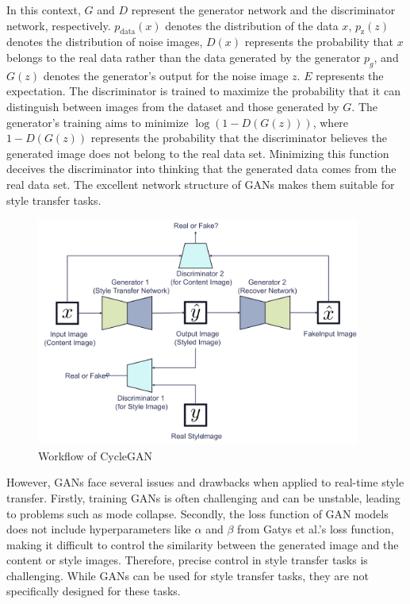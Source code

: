 In this context, $G$ and $D$ represent the generator network and the discriminator network, respectively. $p_{\text{data}}(x)$ denotes the distribution of the data $x$, $p_{\text{z}}(z)$ denotes the distribution of noise images, $D(x)$ represents the probability that $x$ belongs to the real data rather than the data generated by the generator $p_g$, and $G(z)$ denotes the generator's output for the noise image $z$. $E$ represents the expectation. The discriminator is trained to maximize the probability that it can distinguish between images from the dataset and those generated by $G$. The generator's training aims to minimize $\log \left(1-D(G(z))\right)$, where $1-D(G(z))$ represents the probability that the discriminator believes the generated image does not belong to the real data set. Minimizing this function deceives the discriminator into thinking that the generated data comes from the real data set. The excellent network structure of GANs makes them suitable for style transfer tasks.

\begin{figure}[!htbp]%
    \centering%
    \includegraphics[width=0.95\textwidth]{fig/Figure_6_Workflow_of_CycleGAN_[38].pdf}
    \caption{Workflow of CycleGAN \citep{37zhu2017unpaired}}\label{fig7_Zhu}
\end{figure}

However, GANs face several issues and drawbacks when applied to real-time style transfer. Firstly, training GANs is often challenging and can be unstable, leading to problems such as mode collapse. Secondly, the loss function of GAN models does not include hyperparameters like $\alpha$ and $\beta$ from Gatys et al.’s\citep{02gatys2016image} loss function, making it difficult to control the similarity between the generated image and the content or style images. Therefore, precise control in style transfer tasks is challenging. While GANs can be used for style transfer tasks, they are not specifically designed for these tasks.

